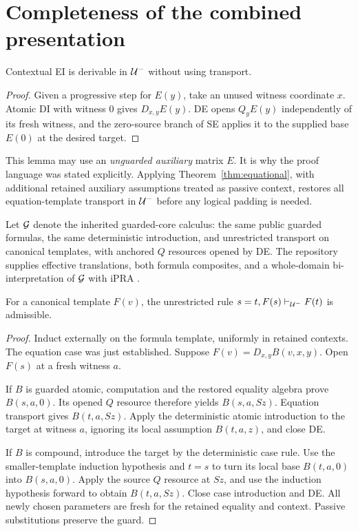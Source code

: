 \section{Completeness of the combined presentation}
\label{sec:complete}

\begin{lemma}
Contextual EI is derivable in $\mathcal U^{-}$ without using transport.
\end{lemma}
\begin{proof}
Given a progressive step for $E(y)$, take an unused witness coordinate
$x$. Atomic DI with witness $0$ gives $D_{x,y}E(y)$. DE opens
$Q_yE(y)$ independently of its fresh witness, and the zero-source branch
of SE applies it to the supplied base $E(0)$ at the desired target.
\end{proof}

This lemma may use an \emph{unguarded auxiliary} matrix $E$. It is why the
proof language was stated explicitly. Applying
Theorem~\ref{thm:equational}, with additional retained auxiliary assumptions
treated as passive context, restores all equation-template transport in
$\mathcal U^{-}$ before any logical padding is needed.

Let $\mathcal G$ denote the inherited guarded-core calculus: the same public
guarded formulas, the same deterministic introduction, and unrestricted
transport on canonical templates, with anchored $Q$ resources opened by DE.
The repository supplies effective translations, both formula composites,
and a whole-domain bi-interpretation of $\mathcal G$ with iPRA \cite{guarded}.

\begin{lemma}
\label{lem:canonicaltransport}
For a canonical template $F(v)$, the unrestricted rule
$s=t,F(s)\vdash_{\mathcal U^{-}}F(t)$ is admissible.
\end{lemma}
\begin{proof}
Induct externally on the formula template, uniformly in retained contexts.
The equation case was just established. Suppose
$F(v)=D_{x,y}B(v,x,y)$. Open $F(s)$ at a fresh witness $a$.

If $B$ is guarded atomic, computation and the restored equality algebra
prove $B(s,a,0)$. Its opened $Q$ resource therefore yields $B(s,a,Sz)$.
Equation transport gives $B(t,a,Sz)$. Apply the deterministic atomic
introduction to the target at witness $a$, ignoring its local assumption
$B(t,a,z)$, and close DE.

If $B$ is compound, introduce the target by the deterministic case rule.
Use the smaller-template induction hypothesis and $t=s$ to turn its local
base $B(t,a,0)$ into $B(s,a,0)$. Apply the source $Q$ resource at $Sz$,
and use the induction hypothesis forward to obtain $B(t,a,Sz)$. Close
case introduction and DE. All newly chosen parameters are fresh for the
retained equality and context. Passive substitutions preserve the guard.
\end{proof}

